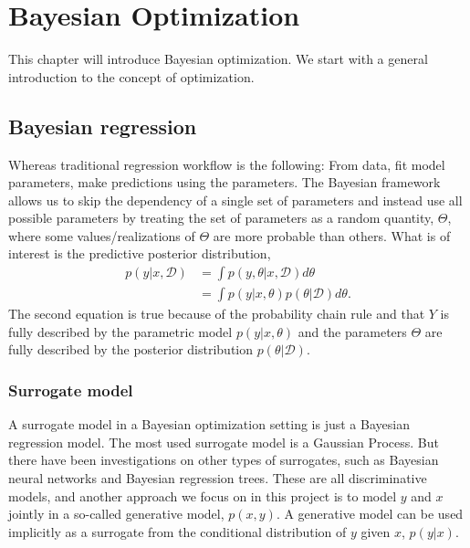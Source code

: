 \chapter{Bayesian Optimization}
This chapter will introduce Bayesian optimization. We start with a general introduction to 
the concept of optimization. 






\section{Bayesian regression}

Whereas traditional regression workflow is the following: From data, fit model parameters, make
predictions using the parameters. The Bayesian framework allows us to skip the dependency of a
single set of parameters and instead use all possible parameters by treating the set of parameters
as a random quantity, $\Theta$, where some values/realizations of $\Theta$ are more probable than
others. What is of interest is the predictive posterior distribution,  
\begin{align}\label{Predictive2}
    p(y|x, \mathcal{D}) &= \int p(y,\theta|x, \mathcal{D}) d\theta\\
    &= \int p(y|x,\theta)p(\theta|\mathcal{D}) d\theta.
\end{align}
The second equation is true because of the probability chain rule and that $Y$ is fully
described by the parametric model $p(y|x,\theta)$ and the parameters $\Theta$ are fully described by
the posterior distribution $p(\theta|\mathcal{D})$.

\subsection{Surrogate model}
A surrogate model in a Bayesian optimization setting is just a Bayesian regression model. The most
used surrogate model is a Gaussian Process. But there have been investigations on other types of
surrogates, such as Bayesian neural networks and Bayesian regression trees. These are all
discriminative models, and another approach we focus on in this project is to model $y$ and
$x$ jointly in a so-called generative model, $p(x,y)$. A generative model can be used implicitly
as a surrogate from the conditional distribution of $y$ given $x$, $p(y|x)$.

